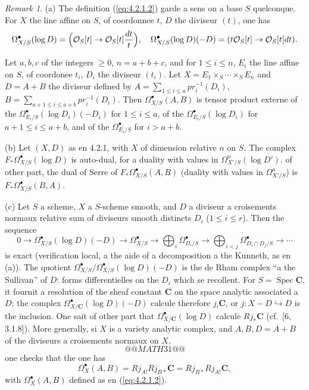 \documentclass[12pt,a4paper]{article}
\theoremstyle{plain}
\theoremstyle{definition}
\theoremstyle{remark}
\newtheorem{remark}[theorem]{Remark}
\DeclareMathOperator{\Spec}{Spec}
\newcommand{\cO}{\mathcal{O}}
\begin{document}
\begin{remark}\label{rem:4.2.2}
\textup{(a)} The definition (\ref{eq:4.2.1.2}) garde a sens on a base $S$ quelconque. For $X$ the line affine on $S$, of coordonnee $t$, $D$ the diviseur $(t)$, one has
\[
\Omega^{\bullet}_{X/S}(\log D) = \Bigl(\cO_S[t] \to \cO_S[t] \frac{dt}{t}\Bigr), \quad
\Omega^{\bullet}_{X/S}(\log D)(-D) = (t\cO_S[t] \to \cO_S[t] dt).
\]

Let $a, b, c$ of the integers $\ge 0$, $n = a + b + c$, and for $1 \le i \le n$, $E_i$ the line affine on $S$, of coordonee $t_i$, $D_i$ the diviseur $(t_i)$. Let $X = E_1 \times_S \cdots \times_S E_n$ and $D = A + B$ the diviseur defined by $A = \sum_{1 \le i \le a} pr_i^{-1}(D_i)$, $B = \sum_{a+1 \le i \le a+b} pr_i^{-1}(D_i)$. Then $\Omega^{\bullet}_{X/S}(A, B)$ is tensor product externe of the $\Omega^{\bullet}_{E_i/S}(\log D_i)(-D_i)$ for $1 \le i \le a$, of the $\Omega^{\bullet}_{E_i/S}(\log D_i)$ for $a+1 \le i \le a+b$, and of the $\Omega^{\bullet}_{E_i/S}$ for $i > a+b$.

\textup{(b)} Let $(X, D)$ as en 4.2.1, with $X$ of dimension relative $n$ on $S$. The complex $F_* \Omega^{\bullet}_{X/S}(\log D)$ is auto-dual, for a duality with values in $\Omega^n_{X'/S}(\log D')$. of other part, the dual of Serre of $F_* \Omega^{\bullet}_{X/S}(A, B)$ (duality with values in $\Omega^n_{X'/S}$) is $F_* \Omega^{\bullet}_{X/S}(B, A)$.

\textup{(c)} Let $S$ a scheme, $X$ a $S$-scheme smooth, and $D$ a diviseur a croisements normaux relative sum of diviseurs smooth distincts $D_i$ ($1 \le i \le r$). Then the sequence
\[
0 \to \Omega^{\bullet}_{X/S}(\log D)(-D) \to \Omega^{\bullet}_{X/S} \to \bigoplus_i \Omega^{\bullet}_{D_i/S} \to \bigoplus_{i<j} \Omega^{\bullet}_{D_i \cap D_j/S} \to \cdots
\]
is exact (verification local, a the aide of a decomposition a the Kunneth, as en (a)). The quotient $\Omega^{\bullet}_{X/S}/\Omega^{\bullet}_{X/S}(\log D)(-D)$ is the de Rham complex ``a the Sullivan'' of $D$: forms differentielles on the $D_i$ which se recollent. For $S = \Spec \mathbf{C}$, it fournit a resolution of the sheaf constant $\mathbf{C}$ on the space analytic associated a $D$; the complex $\Omega^{\bullet}_{X/\mathbf{C}}(\log D)(-D)$ calcule therefore $j_! \mathbf{C}$, or $j: X - D \hookrightarrow D$ is the inclusion. One sait of other part that $\Omega^{\bullet}_{X/\mathbf{C}}(\log D)$ calcule $Rj_* \mathbf{C}$ (cf.~[6, 3.1.8]). More generally, si $X$ is a variety analytic complex, and $A, B, D = A + B$ of the diviseurs a croisements normaux on $X$,
\[
@@MATH31@@
\]
one checks that the one has
\[
\Omega^{\bullet}_X(A, B) = Rj_{A!} Rj_{B*} \mathbf{C} = Rj_{B*} Rj_{A!} \mathbf{C},
\]
with $\Omega^{\bullet}_X(A, B)$ defined as en (\ref{eq:4.2.1.2}).
\end{remark}
\end{document}
